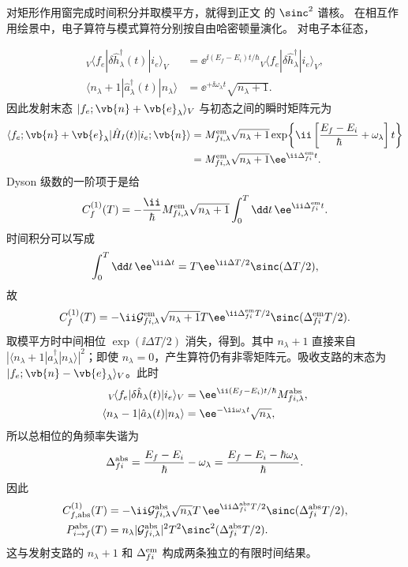 \begin{derivation}[有限作用时间的一量子发射概率]
对矩形作用窗完成时间积分并取模平方，就得到正文 的 $\sinc^2$ 谱核。 在相互作用绘景中，电子算符与模式算符分别按自由哈密顿量演化。 对电子本征态，

\begin{align*}
{}_V\!\langle f_e|\delta\hat h_\lambda^\dagger(t)|i_e\rangle_V
&=\ee^{\ii(E_f-E_i)t/\hbar}
{}_V\!\langle f_e|\delta\hat h_\lambda^\dagger|i_e\rangle_V,\\
\langle n_\lambda+1|\hat a_\lambda^\dagger(t)|n_\lambda\rangle
&=\ee^{+\ii\omega_\lambda t}\sqrt{n_\lambda+1}.
\end{align*}
因此发射末态 $|f_e;\vb{n}+\vb{e}_\lambda\rangle_V$ 与初态之间的瞬时矩阵元为
\begin{align*}
\langle f_e;\vb{n}+\vb{e}_\lambda|\hat H_I(t)|i_e;\vb{n}\rangle
&=M_{fi,\lambda}^{\rm em}\sqrt{n_\lambda+1}
\exp\!\left\{\ii\left[\frac{E_f-E_i}{\hbar}+\omega_\lambda\right]t\right\}\\
&=M_{fi,\lambda}^{\rm em}\sqrt{n_\lambda+1}
\ee^{\ii\Delta_{fi}^{\rm em}t}.
\end{align*}
Dyson 级数的一阶项于是给
\[
C_f^{(1)}(T)
=-\frac{\ii}{\hbar}M_{fi,\lambda}^{\rm em}\sqrt{n_\lambda+1}
\int_0^T\dd t\,\ee^{\ii\Delta_{fi}^{\rm em}t}.
\]
时间积分可以写成
\[
\int_0^T\dd t\,\ee^{\ii\Delta t}
=T\ee^{\ii\Delta T/2}\sinc(\Delta T/2),
\]
故
\[
C_f^{(1)}(T)
=-\ii\mathcal G_{fi,\lambda}^{\rm em}\sqrt{n_\lambda+1}
T\ee^{\ii\Delta_{fi}^{\rm em}T/2}
\sinc(\Delta_{fi}^{\rm em}T/2).
\]
取模平方时中间相位 $\exp(\ii\Delta T/2)$ 消失，得到。其中 $n_\lambda+1$ 直接来自 $|\langle n_\lambda+1|a_\lambda^\dagger|n_\lambda\rangle|^2$；即使 $n_\lambda=0$，产生算符仍有非零矩阵元。吸收支路的末态为 $|f_e;\vb{n}-\vb{e}_\lambda\rangle_V$。此时
\begin{align*}
{}_V\!\langle f_e|\delta\hat h_\lambda(t)|i_e\rangle_V
&=\ee^{\ii(E_f-E_i)t/\hbar}M_{fi,\lambda}^{\rm abs},\\
\langle n_\lambda-1|\hat a_\lambda(t)|n_\lambda\rangle
&=\ee^{-\ii\omega_\lambda t}\sqrt{n_\lambda},
\end{align*}
所以总相位的角频率失谐为
\[
 \Delta_{fi}^{\rm abs}
 =\frac{E_f-E_i}{\hbar}-\omega_\lambda
 =\frac{E_f-E_i-\hbar\omega_\lambda}{\hbar}.
\]
因此
\begin{align*}
 C_{f,\rm abs}^{(1)}(T)
 &=-\ii\mathcal G_{fi,\lambda}^{\rm abs}\sqrt{n_\lambda}
 T\,\ee^{\ii\Delta_{fi}^{\rm abs}T/2}
 \sinc(\Delta_{fi}^{\rm abs}T/2),\\
 P_{i\to f}^{\rm abs}(T)
 &=n_\lambda|\mathcal G_{fi,\lambda}^{\rm abs}|^2T^2
 \sinc^2(\Delta_{fi}^{\rm abs}T/2).
\end{align*}
这与发射支路的 $n_\lambda+1$ 和 $\Delta_{fi}^{\rm em}$ 构成两条独立的有限时间结果。
\end{derivation}


